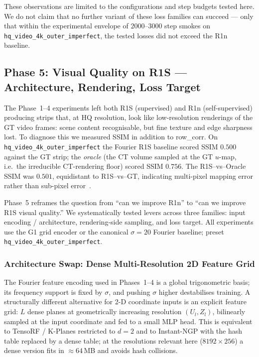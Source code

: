 \documentclass[11pt,a4paper]{article}
\begin{document}
These observations are limited to the configurations and step budgets tested here. We do not claim that no further variant of these loss families can succeed --- only that within the experimental envelope of $2000$--$3000$ step smokes on \texttt{hq\_video\_4k\_outer\_imperfect}, the tested losses did not exceed the R1n baseline.

\subsection{Phase 5: Visual Quality on R1S --- Architecture, Rendering, Loss Target}
\label{sec:phase5_visual_quality}

The Phase~1--4 experiments left both R1S (supervised) and R1n (self-supervised) producing strips that, at HQ resolution, look like low-resolution renderings of the GT video frames: scene content recognisable, but fine texture and edge sharpness lost. To diagnose this we measured SSIM in addition to row\_corr. On \texttt{hq\_video\_4k\_outer\_imperfect} the Fourier R1S baseline scored SSIM $0.500$ against the GT strip; the \emph{oracle} (the CT volume sampled at the GT $u$-map, i.e.\ the irreducible CT-rendering floor) scored SSIM $0.756$. The R1S--vs--Oracle SSIM was $0.501$, equidistant to R1S--vs--GT, indicating multi-pixel mapping error rather than sub-pixel error~\cite{wang2004ssim}.

Phase~5 reframes the question from ``can we improve R1n'' to ``can we improve R1S visual quality.'' We systematically tested levers across three families: input encoding / architecture, rendering-side sampling, and loss target. All experiments use the G1 grid encoder or the canonical $\sigma=20$ Fourier baseline; preset \texttt{hq\_video\_4k\_outer\_imperfect}.

\subsubsection{Architecture Swap: Dense Multi-Resolution 2D Feature Grid}

The Fourier feature encoding \cite{tancik2020fourier} used in Phases~1--4 is a global trigonometric basis; its frequency support is fixed by $\sigma$, and pushing $\sigma$ higher destabilises training. A structurally different alternative for 2-D coordinate inputs is an explicit feature grid: $L$ dense planes at geometrically increasing resolution $(U_l, Z_l)$, bilinearly sampled at the input coordinate and fed to a small MLP head. This is equivalent to TensoRF \cite{chen2022tensorf} / K-Planes \cite{fridovich2023kplanes} restricted to $d=2$ and to Instant-NGP \cite{mueller2022instantngp} with the hash table replaced by a dense table; at the resolutions relevant here ($8192 \times 256$) a dense version fits in $\approx 64$\,MB and avoids hash collisions.
\end{document}
